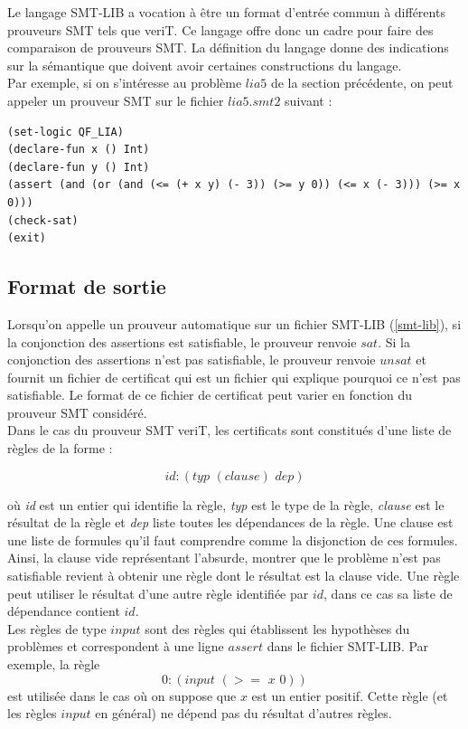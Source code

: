\documentclass[11pt]{article}
\begin{document}
Le langage SMT-LIB a vocation à être un format d'entrée commun à différents prouveurs SMT tels que veriT. Ce langage offre donc un cadre pour faire des comparaison de prouveurs SMT. La définition du langage \cite{smtlib} donne des indications sur la sémantique que doivent avoir certaines constructions du langage.\\

Par exemple, si on s'intéresse au problème $lia5$ de la section précédente, on peut appeler un prouveur SMT sur le fichier $lia5.smt2$ suivant :     
\begin{lstlisting}[frame=single]
(set-logic QF_LIA)
(declare-fun x () Int)
(declare-fun y () Int)
(assert (and (or (and (<= (+ x y) (- 3)) (>= y 0)) (<= x (- 3))) (>= x 0)))
(check-sat)
(exit)
\end{lstlisting}

\subsection{Format de sortie} \label{sortie}

Lorsqu'on appelle un prouveur automatique sur un fichier SMT-LIB (\ref{smt-lib}), si la conjonction des assertions est satisfiable, le prouveur renvoie $sat$. Si la conjonction des assertions n'est pas satisfiable, le prouveur renvoie $unsat$ et fournit un fichier de certificat qui est un fichier qui explique pourquoi ce n'est pas satisfiable. Le format de ce fichier de certificat peut varier en fonction du prouveur SMT considéré. \\


Dans le cas du prouveur SMT veriT, les certificats sont constitués d'une liste de règles de la forme : 

\[id:(typ \,\, (clause) \,\, dep)\]

où \textit{id} est un entier qui identifie la règle, \textit{typ} est le type de la règle, \textit{clause} est le résultat de la règle et \textit{dep} liste toutes les dépendances de la règle. Une clause est une liste de formules qu'il faut comprendre comme la disjonction de ces formules. Ainsi, la clause vide représentant l'absurde, montrer que le problème n'est pas satisfiable revient à obtenir une règle dont le résultat est la clause vide. Une règle peut utiliser le résultat d'une autre règle identifiée par $id$, dans ce cas sa liste de dépendance contient $id$. \\

Les règles de type $input$ sont des règles qui établissent les hypothèses du problèmes et correspondent à une ligne $assert$ dans le fichier SMT-LIB. Par exemple, la règle 
\[ 0:(input \,\, (>= \,\,x \,\,0)) \]
est utilisée dans le cas où on suppose que $x$ est un entier positif. Cette règle (et les règles $input$ en général) ne dépend pas du résultat d'autres règles.\\
\end{document}
